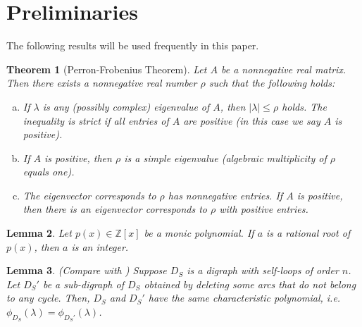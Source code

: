 \documentclass[12pt,a4paper,reqno]{amsart}
\numberwithin{equation}{section}
\theoremstyle{plain}
\newtheorem{theorem}{Theorem}[section]
\newtheorem{lemma}[theorem]{Lemma}
\theoremstyle{definition}
\newcommand{\<}{\langle}
\renewcommand{\>}{\rangle}
\newcommand{\Z}{{\mathbb Z}}
\begin{document}
    \section{Preliminaries }
    \label{sec2}
    The following results will be used frequently in this paper.

    \begin{theorem}[Perron-Frobenius Theorem] \cite{perron1907, frobenius1912}
    \label{Perron}
    Let $A$ be a nonnegative real matrix. Then there exists a   nonnegative real number $\rho$ such that the following holds:
    \begin{enumerate}[(a)]
    \item If $\lambda$ is any (possibly complex) eigenvalue  of $A$, then $|\lambda|\leq \rho$ holds. The inequality is strict if all entries of $A$ are positive (in this case we say $A$ is positive).
    
    \item If $A$ is positive, then $\rho$ is a simple eigenvalue (algebraic multiplicity of $\rho$ equals one).
    
    \item The eigenvector corresponds to $\rho$ has nonnegative entries. If $A$ is positive, then there is an eigenvector corresponds to $\rho$ with positive entries.
\end{enumerate}
    
\end{theorem}

\begin{lemma}
    \cite{1996herstein_abstract_algebra}
    \label{rationalrootsofmonic}
    Let $p(x)\in \Z[x]$ be a monic polynomial. If $a$ is a rational root of $p(x)$, then $a$ is an integer.
\end{lemma}

\begin{lemma}
    \label{charpoly_arc_deletion}
    (Compare with \cite[Theorem 2.3]{rada2009mcclelland})
    Suppose $D_S$ is a digraph with self-loops of order $n$. Let $D_S'$ be a sub-digraph of $D_S$ obtained by deleting some arcs that do not belong to any cycle. Then, $D_S$ and $D_S'$ have the same characteristic polynomial, i.e.
    $\phi_{D_S}(\lambda)=\phi_{D_S'}(\lambda)$.
\end{lemma}
\end{document}
